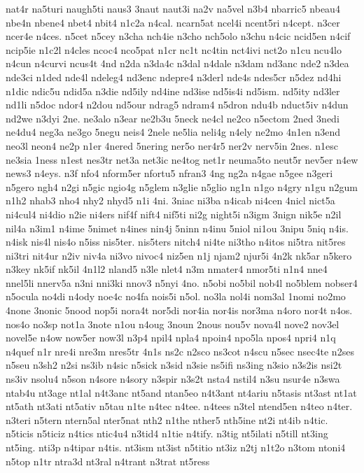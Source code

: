 {nat4r
na5turi
naugh5ti
naus3
3naut
naut3i
na2v
na5vel
n3b4
nbarric5
nbeau4
nbe4n
nbene4
nbet4
nbit4
n1c2a
n4cal.
ncarn5at
ncel4i
ncent5ri
n4cept.
n3cer
ncer4e
n4ces.
n5cet
n5cey
n3cha
nch4ie
n3cho
nch5olo
n3chu
n4cic
ncid5en
n4cif
ncip5ie
n1c2l
n4cles
ncoc4
nco5pat
n1cr
nc1t
nc4tin
nct4ivi
nct2o
n1cu
ncu4lo
n4cun
n4curvi
ncus4t
4nd
n2da
n3da4c
n3dal
n4dale
n3dam
nd3anc
nde2
n3dea
nde3ci
n1ded
nde4l
ndeleg4
nd3enc
ndepre4
n3derl
nde4s
ndes5cr
n5dez
nd4hi
n1dic
ndic5u
ndid5a
n3die
nd5ily
nd4ine
nd3ise
nd5is4i
nd5ism.
nd5ity
nd3ler
nd1li
n5doc
ndor4
n2dou
nd5our
ndrag5
ndram4
n5dron
ndu4b
nduct5iv
n4dun
nd2we
n3dyi
2ne.
ne3alo
n3ear
ne2b3u
5neck
ne4cl
ne2co
n5ectom
2ned
3nedi
ne4du4
neg3a
ne3go
5negu
neis4
2nele
ne5lia
neli4g
n4ely
ne2mo
4n1en
n3end
neo3l
neon4
ne2p
n1er
4nered
5nering
ner5o
ner4r5
ner2v
nerv5in
2nes.
n1esc
ne3sia
1ness
n1est
nes3tr
net3a
net3ic
ne4tog
net1r
neuma5to
neut5r
nev5er
n4ew
news3
n4eys.
n3f
nfo4
nform5er
nfortu5
nfran3
4ng
ng2a
n4gae
n5gee
n3geri
n5gero
ngh4
n2gi
n5gic
ngio4g
n5glem
n3glie
n5glio
ng1n
n1go
n4gry
n1gu
n2gum
n1h2
nhab3
nho4
nhy2
nhyd5
n1i
4ni.
3niac
ni3ba
n4icab
ni4cen
4nicl
nict5a
ni4cul4
ni4dio
n2ie
ni4ers
nif4f
nift4
nif5ti
ni2g
night5i
n3igm
3nign
nik5e
n2il
nil4a
n3im1
n4ime
5nimet
n4ines
nin4j
5ninn
n4inu
5niol
ni1ou
3nipu
5niq
n4is.
n4isk
nis4l
nis4o
n5iss
nis5ter.
nis5ters
nitch4
ni4te
ni3tho
n4itos
ni5tra
nit5res
ni3tri
nit4ur
n2iv
niv4a
ni3vo
nivoc4
niz5en
n1j
njam2
njur5i
4n2k
nk5ar
n5kero
n3key
nk5if
nk5il
4n1l2
nland5
n3le
nlet4
n3m
nmater4
nmor5ti
n1n4
nne4
nnel5li
nnerv5a
n3ni
nni3ki
nnov3
n5nyi
4no.
n5obi
no5bil
nob4l
no5blem
nobser4
n5ocula
no4di
n4ody
noe4c
no4fa
nois5i
n5ol.
no3la
nol4i
nom3al
1nomi
no2mo
4none
3nonic
5nood
nop5i
nora4t
nor5di
nor4ia
nor4is
nor3ma
n4oro
nor4t
n4os.
nos4o
no3sp
not1a
3note
n1ou
n4oug
3noun
2nous
nou5v
nova4l
nove2
nov3el
novel5e
n4ow
now5er
now3l
n3p4
npil4
npla4
npoin4
npo5la
npos4
npri4
n1q
n4quef
n1r
nre4i
nre3m
nres5tr
4n1s
ns2c
n2sco
ns3cot
n4scu
n5sec
nsec4te
n2ses
n5seu
n3sh2
n2si
ns3ib
n4sic
n5sick
n3sid
n3sie
ns5ifi
ns3ing
n3sio
n3s2is
nsi2t
ns3iv
nsolu4
n5son
n4sore
n4sory
n3spir
n3s2t
nsta4
nstil4
n3su
nsur4e
n3swa
ntab4u
nt3age
nt1al
n4t3anc
nt5and
ntan5eo
n4t3ant
nt4ariu
n5tasis
nt3ast
nt1at
nt5ath
nt3ati
nt5ativ
n5tau
n1te
n4tec
n4tee.
n4tees
n3tel
ntend5en
n4teo
n4ter.
n3teri
n5tern
ntern5al
nter5nat
nth2
n1the
nther5
nth5ine
nt2i
nt4ib
n4tic.
n5ticis
n5ticiz
n4tics
ntic4u4
n3tid4
n1tie
n4tify.
n3tig
nt5ilati
n5till
nt3ing
nt5ing.
nti3p
n4tipar
n4tis.
nt3ism
nt3ist
n5titio
nt3iz
n2tj
n1t2o
n3tom
ntoni4
n5top
n1tr
ntra3d
nt3ral
n4trant
n3trat
nt5ress
}

